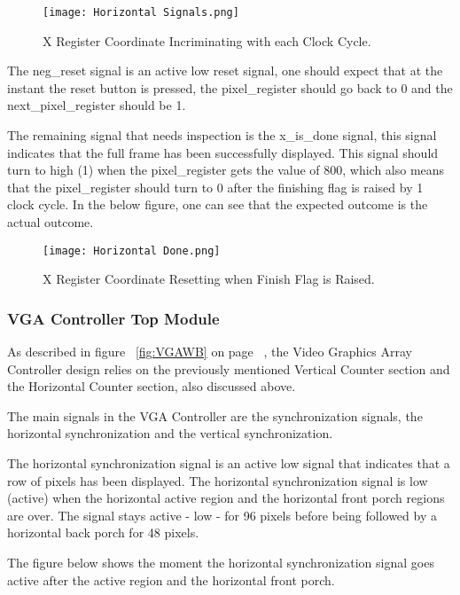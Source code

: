 \begin{figure}[H]
    \centering
    \texttt{[image: Horizontal Signals.png]}
    \caption{ X Register Coordinate Incriminating with each Clock Cycle. }
    \label{fig:HSigs}  
\end{figure}

\par The neg\_reset signal is an active low reset signal, one should expect that at the instant the reset button is pressed, the pixel\_register should go back to 0 and the next\_pixel\_register should be 1. \newline

\par The remaining signal that needs inspection is the x\_is\_done signal, this signal indicates that the full frame has been successfully displayed. This signal should turn to high (1) when the pixel\_register gets the value of 800, which also means that the pixel\_register should turn to 0 after the finishing flag is raised by 1 clock cycle. In the below figure, one can see that the expected outcome is the actual outcome. \newline

\begin{figure}[H]
    \centering
    \texttt{[image: Horizontal Done.png]}
    \caption{ X Register Coordinate Resetting when Finish Flag is Raised. }
    \label{fig:HDone}  
\end{figure}

\subsubsection{VGA Controller Top Module}
\par As described in figure ~\ref{fig:VGAWB} on page ~\pageref{fig:VGAWB}, the Video Graphics Array Controller design relies on the previously mentioned Vertical Counter section and the Horizontal Counter section, also discussed above. \newline
\par The main signals in the VGA Controller are the synchronization signals, the horizontal synchronization and the vertical synchronization. \newline
\par The horizontal synchronization signal is an active low signal that indicates that a row of pixels has been displayed. The horizontal synchronization signal is low (active) when the horizontal active region and the horizontal front porch regions are over. The signal stays active - low - for 96 pixels before being followed by a horizontal back porch for 48 pixels.  \newline
\par The figure below shows the moment the horizontal synchronization signal goes active after the active region and the horizontal front porch. \newline


